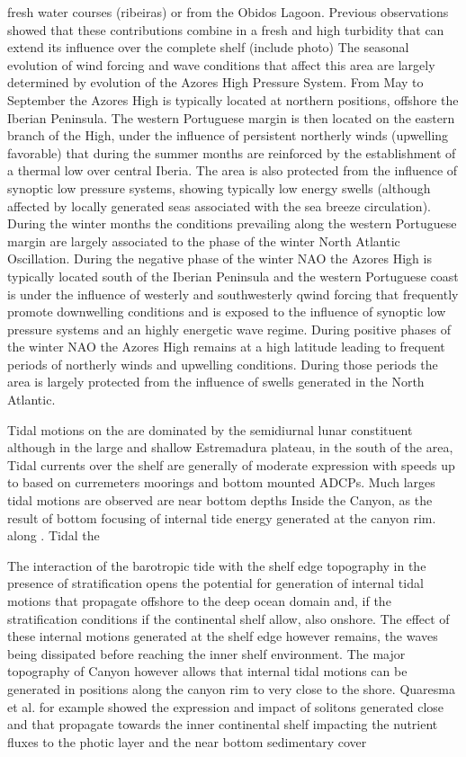 fresh water courses (ribeiras) or from the Obidos Lagoon. Previous
observations showed that these contributions combine in a fresh and
high turbidity that can extend its influence over the complete shelf
(include photo) The seasonal evolution of wind forcing and wave
conditions that affect this area are largely determined by evolution
of the Azores High Pressure System. From May to September the Azores
High is typically located at northern positions, offshore the Iberian
Peninsula. The western Portuguese margin is then located on the
eastern branch of the High, under the influence of persistent
northerly winds (upwelling favorable) that during the summer months
are reinforced by the establishment of a thermal low over central
Iberia. The area is also protected from the influence of synoptic low
pressure systems, showing typically low energy swells (although
affected by locally generated seas associated with the sea breeze
circulation). During the winter months the conditions prevailing along
the western Portuguese margin are largely associated to the phase of
the winter North Atlantic Oscillation. During the negative phase of
the winter NAO the Azores High is typically located south of the
Iberian Peninsula and the western Portuguese coast is under the
influence of westerly and southwesterly qwind forcing that frequently
promote downwelling conditions and is exposed to the influence of
synoptic low pressure systems and an highly energetic wave
regime. During positive phases of the winter NAO the Azores High
remains at a high latitude leading to frequent periods of northerly
winds and upwelling conditions. During those periods the area is
largely protected from the influence of swells generated in the North
Atlantic.
 
 
Tidal motions on the are dominated by the semidiurnal lunar constituent
although in the large and shallow Estremadura plateau, in the south of
the area, Tidal currents over the shelf are generally of moderate
expression with speeds up to based on curremeters moorings and bottom
mounted ADCPs.  Much larges tidal motions are observed are near bottom
depths Inside the \naz Canyon, as the result of bottom focusing of
internal tide energy generated at the canyon rim.  along . Tidal the
 
The interaction of the barotropic tide with the shelf edge topography
in the presence of stratification opens the potential for generation
of internal tidal motions that propagate offshore to the deep ocean
domain and, if the stratification conditions if the continental shelf
allow, also onshore. The effect of these internal motions generated at
the shelf edge however remains, the waves being dissipated before
reaching the inner shelf environment. The major topography of \naz
Canyon however allows that internal tidal motions can be generated in
positions along the canyon rim to very close to the shore. Quaresma et
al. for example showed the expression and impact of solitons generated
close and that propagate towards the inner continental shelf impacting
the nutrient fluxes to the photic layer and the near bottom
sedimentary cover

